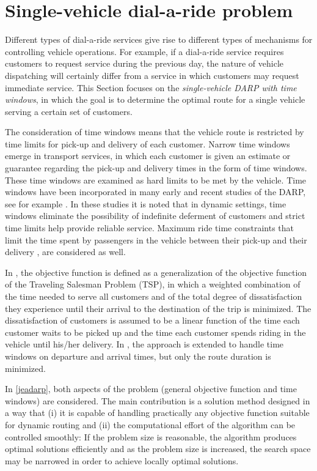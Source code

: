 \documentclass[dissertation,draft*]{aaltoseries}
\begin{document}
\section{Single-vehicle dial-a-ride problem}
\label{singlevehicle}
Different types of dial-a-ride services give rise to
different types of mechanisms for controlling vehicle operations. 
For example, if a dial-a-ride service requires customers to request 
service during the previous day, the nature of vehicle
dispatching will certainly differ from a service in which
customers may request immediate service.
This Section focuses on %
the \emph{single-vehicle DARP with time windows}, in which the goal is to determine the optimal
route for a single vehicle serving a certain set of customers.

The consideration of time windows means that the vehicle route is 
restricted by time limits for pick-up and delivery of each customer.
Narrow time windows emerge in transport services, in which each customer
is given an estimate or guarantee regarding the pick-up and delivery times in the 
form of time windows. These time windows are examined as hard limits to be met by the vehicle.
Time windows have been incorporated in many early and recent studies of the DARP, see for example 
\cite{psaraftis02, jaw, madsen, toth02,cordeau02,diana, wong, cordeau01, berbegliafeas}.
In these studies it is noted that in dynamic settings, time windows eliminate the possibility of indefinite
deferment of customers and strict time limits help provide reliable service.
Maximum ride time constraints that limit the time spent by passengers in the vehicle
between their pick-up and their delivery \cite{hunsaker}, 
are considered as well.

In \cite{psaraftis01}, the objective function is defined as a
generalization of the objective function of the Traveling Salesman Problem (TSP), 
in which a weighted combination
of the time needed to serve all customers and of the total degree of dissatisfaction
they experience until their arrival to the destination of the trip is minimized. The dissatisfaction of
customers is assumed to be a linear function of the time each customer waits to be picked up and the 
time each customer spends riding in the vehicle until his/her delivery.
In \cite{psaraftis02}, the approach is extended to handle time windows on departure and arrival times,
but only the route duration is minimized. 

In \ref{jeadarp}, both aspects of the problem (general objective function and time windows)
are considered. The main contribution is a solution method designed in a way that (i) it is capable of
handling practically any objective function suitable for dynamic routing and (ii) the computational
effort of the algorithm can be controlled smoothly: If the problem size is reasonable, 
the algorithm produces optimal solutions efficiently and as the problem size is increased,
the search space may be narrowed in order to achieve locally optimal solutions.
\end{document}
